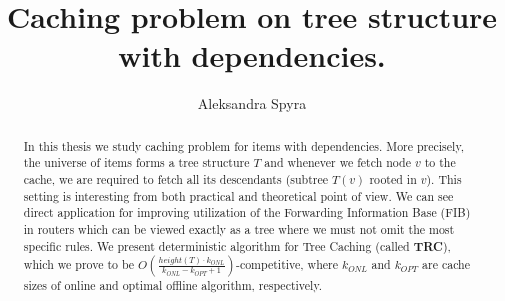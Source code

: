 \documentclass[a4paper,10pt]{article}
\title{Caching problem on tree structure with dependencies.}
\author{Aleksandra Spyra}
\begin{document}
\maketitle

\begin{abstract}
In this thesis we study caching problem for items with dependencies.
More precisely, the universe of items forms a tree structure $T$ and whenever
we fetch node $v$ to the cache, we are required to fetch all its descendants
(subtree $T(v)$ rooted in $v$). This setting is interesting from both practical 
and theoretical point of view. We can see direct application for improving 
utilization of the Forwarding Information Base (FIB) in routers which can be 
viewed exactly as a tree where we must not omit the most specific rules. We 
present deterministic algorithm for Tree Caching (called \textbf{TRC}), which 
we 
prove to be $O(\frac{height(T) \cdot k_{ONL}}{k_{ONL} - k_{OPT} + 
1})$-competitive, 
where $k_{ONL}$ and $k_{OPT}$ are cache sizes of online and optimal offline 
algorithm, respectively. 
\end{abstract}

\tableofcontents





\printbibliography
\end{document}
